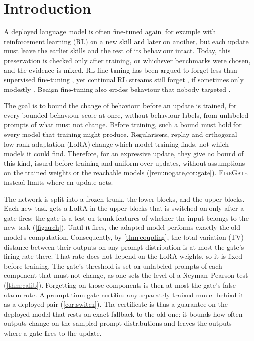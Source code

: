 \documentclass{article}
\theoremstyle{plain}
\theoremstyle{definition}
\theoremstyle{remark}
\newcommand{\method}{\textsc{FireGate}}
\begin{document}
\section{Introduction}
\label{sec:intro}

A deployed language model is often fine-tuned again, for example with reinforcement learning (RL) on a new skill and later on another, but each update must leave the earlier skills and the rest of its behaviour intact. Today, this preservation is checked only after training, on whichever benchmarks were chosen, and the evidence is mixed.
RL fine-tuning has been argued to forget less than supervised fine-tuning \citep{shenfeld2026razor,chen2025retaining,lai2025reinforcement}, yet continual RL streams still forget \citep{luo2026cpo}, if sometimes only modestly \citep{luo2026beyond}. Benign fine-tuning also erodes behaviour that
nobody targeted \citep{qi2024finetuning,ung2024chained,li2024examining,betley2026training}.

The goal is to bound the change of behaviour before an update is trained, for every bounded behaviour score at once, without behaviour labels, from unlabeled prompts of what must not change. Before training, such a bound must hold for every model that training might produce. Regularisers, replay and orthogonal low-rank adaptation (LoRA) change which model training finds, not which models it could find. Therefore, for an expressive update, they give no bound of this kind, issued before training and uniform over
updates, without assumptions on the trained weights or the reachable models (\cref{rem:nogate,cor:gate}). \method{} instead limits where an update acts.

The network is split into a frozen trunk, the lower blocks, and the upper blocks. Each new task gets a LoRA in the upper blocks that is switched on only after a gate fires; the gate is a test on trunk features of whether the input belongs to the new task (\cref{fig:arch}). Until it fires, the adapted model performs exactly the old model's computation. Consequently, by \cref{thm:coupling}, the total-variation (TV) distance between their outputs on any prompt distribution is at most the gate's firing rate there. That rate does not depend on the LoRA weights, so it is fixed before training. The gate's threshold is set on unlabeled prompts of each component that must not change, as one sets the level of a Neyman--Pearson test (\cref{thm:calib}). Forgetting on those components is then at most the gate's false-alarm rate. A prompt-time gate certifies any
separately trained model behind it as a deployed pair (\cref{cor:switch}). The certificate is thus a guarantee on the
deployed model that rests on exact fallback to the old one: it bounds how often outputs change on the sampled prompt
distributions and leaves the outputs where a gate fires to the update.
\end{document}
